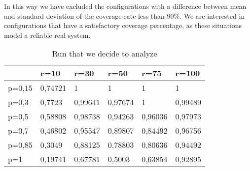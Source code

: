 In this way we have excluded the configurations with a difference between mean and standard deviation of the coverage rate less than 90\%. We are interested in configurations that have a satisfactory coverage percentage, as these situations model a reliable real system.
\begin{table}[h!]
\centering
\begin{tabular}{|l|l|l|l|l|l|}
\hline
       & r=10    & r=30                            & r=50                            & r=75                            & r=100                           \\ \hline
p=0,15 & 0,74721 & \cellcolor[HTML]{92D050}1       & \cellcolor[HTML]{92D050}1       & \cellcolor[HTML]{92D050}1       & \cellcolor[HTML]{92D050}1       \\ \hline
p=0,3  & 0,7723  & \cellcolor[HTML]{92D050}0,99641 & \cellcolor[HTML]{92D050}0,97674 & \cellcolor[HTML]{92D050}1       & \cellcolor[HTML]{92D050}0,99489 \\ \hline
p=0,5  & 0,58808 & \cellcolor[HTML]{92D050}0,98738 & \cellcolor[HTML]{92D050}0,94263 & \cellcolor[HTML]{92D050}0,96036 & \cellcolor[HTML]{92D050}0,97973 \\ \hline
p=0,7  & 0,46802 & \cellcolor[HTML]{92D050}0,95547 & \cellcolor[HTML]{92D050}0,89807 & 0,84492                         & \cellcolor[HTML]{92D050}0,96756 \\ \hline
p=0,85 & 0,3049  & \cellcolor[HTML]{92D050}0,88125 & 0,78803                         & 0,80636                         & \cellcolor[HTML]{92D050}0,94492 \\ \hline
p=1    & 0,19741 & 0,67781                         & 0,5003                          & 0,63854                         & \cellcolor[HTML]{92D050}0,92895 \\ \hline
\end{tabular}
\caption{Run that we decide to analyze}
\label{tab:my-table}
\end{table}

